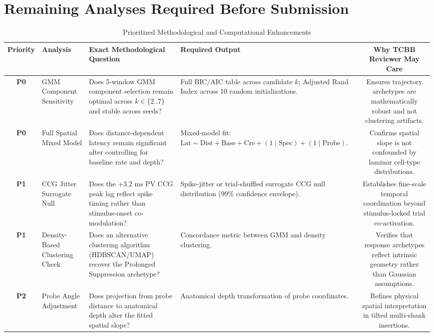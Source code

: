 \documentclass[10pt,journal,compsoc]{IEEEtran}
\begin{document}
\section*{Remaining Analyses Required Before Submission}
\begin{table}[h]
\caption{Prioritized Methodological and Computational Enhancements}
\label{tab:remaining_analyses}
\centering
\begin{tabularx}{\textwidth}{clXXc}
\toprule
\textbf{Priority} & \textbf{Analysis} & \textbf{Exact Methodological Question} & \textbf{Required Output} & \textbf{Why TCBB Reviewer May Care} \\
\midrule
\textbf{P0} & GMM Component Sensitivity & Does 5-window GMM component selection remain optimal across $k \in \{2..7\}$ and stable across seeds? & Full BIC/AIC table across candidate $k$; Adjusted Rand Index across 10 random initializations. & Ensures trajectory archetypes are mathematically robust and not clustering artifacts. \\
\textbf{P0} & Full Spatial Mixed Model & Does distance-dependent latency remain significant after controlling for baseline rate and depth? & Mixed-model fit: $\text{Lat} \sim \text{Dist} + \text{Base} + \text{Cre} + (1\mid\text{Spec}) + (1\mid\text{Probe})$. & Confirms spatial slope is not confounded by laminar cell-type distributions. \\
\textbf{P1} & CCG Jitter Surrogate Null & Does the $+3.2\text{ ms}$ PV CCG peak lag reflect spike timing rather than stimulus-onset co-modulation? & Spike-jitter or trial-shuffled surrogate CCG null distribution (99\% confidence envelope). & Establishes fine-scale temporal coordination beyond stimulus-locked trial co-activation. \\
\textbf{P1} & Density-Based Clustering Check & Does an alternative clustering algorithm (HDBSCAN/UMAP) recover the Prolonged Suppression archetype? & Concordance metric between GMM and density clustering. & Verifies that response archetypes reflect intrinsic geometry rather than Gaussian assumptions. \\
\textbf{P2} & Probe Angle Adjustment & Does projection from probe distance to anatomical depth alter the fitted spatial slope? & Anatomical depth transformation of probe coordinates. & Refines physical spatial interpretation in tilted multi-shank insertions. \\
\bottomrule
\end{tabularx}
\end{table}



\end{document}
